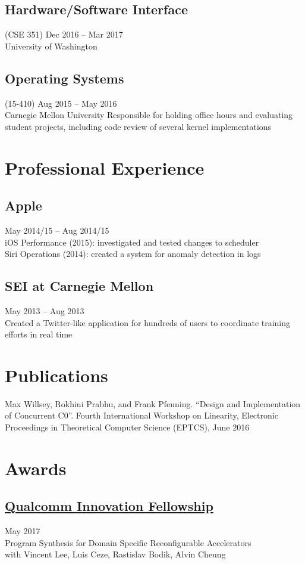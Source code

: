 \documentclass{article}
\begin{document}
\subsection{Hardware/Software Interface} (CSE 351)
\hfill Dec 2016 -- Mar 2017\\
University of Washington

\subsection{Operating Systems} (15-410)
\hfill Aug 2015 -- May 2016 \\
Carnegie Mellon University
Responsible for holding office hours and evaluating student projects, including code review of several kernel implementations

\section{Professional Experience}

\subsection{Apple}
\hfill May 2014/15 -- Aug 2014/15 \\
iOS Performance (2015): investigated and tested changes to scheduler \\
Siri Operations (2014): created a system for anomaly detection in logs

\subsection{SEI at Carnegie Mellon}
\hfill May 2013 -- Aug 2013 \\
Created a Twitter-like application for hundreds of users to coordinate training efforts in real time

\section{Publications}

Max Willsey, Rokhini Prabhu, and Frank Pfenning.
``Design and Implementation of Concurrent C0''.
Fourth International Workshop on Linearity, Electronic Proceedings in Theoretical Computer Science (EPTCS), June 2016

\section{Awards}
\subsection{
  \href{https://www.qualcomm.com/invention/research/university-relations/innovation-fellowship/winners}
  {Qualcomm Innovation Fellowship}}
\hfill May 2017 \\
Program Synthesis for Domain Specific Reconfigurable Accelerators \\
with Vincent Lee, Luis Ceze, Rastislav Bodik, Alvin Cheung
\end{document}

